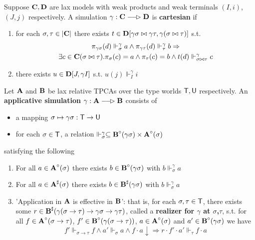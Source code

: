 \documentclass[11pt]{article}
\begin{document}
\begin{definition}[]
Suppose \(\operatorname{\textbf{C}},\operatorname{\textbf{D}}\) are lax models with weak products and weak terminals \((I,i)\), \((J,j)\)
respectively. A simulation \(\gamma:\bC\lrarhd\bD\) is \textbf{cartesian} if
\begin{enumerate}
\item for each \(\sigma,\tau\in\abs{\bC}\) there exists \(t\in\operatorname{\textbf{D}}[\gamma\sigma\bowtie\gamma\tau,\gamma(\sigma\bowtie\tau)]\) s.t.
\begin{gather*}
\pi_{\gamma\sigma}(d)\Vdash_\sigma^\gamma a\wedge\pi_{\gamma\tau}(d)\Vdash_\tau^\gamma b\Rightarrow\\
\exists c\in\operatorname{\textbf{C}}(\sigma\bowtie\tau).\pi_\sigma(c)=a\wedge\pi_\tau(c)=b\wedge t(d)\Vdash_{\sigma\bowtie\tau}^\gamma c
\end{gather*}
\item there exists \(u\in\operatorname{\textbf{D}}[J,\gamma I]\) s.t. \(u(j)\Vdash_I^\gamma i\)
\end{enumerate}
\end{definition}


\begin{definition}[]
Let \(\operatorname{\textbf{A}}\) and \(\operatorname{\textbf{B}}\) be lax relative TPCAs over the type worlds \(\textsf{T},\textsf{U}\) respectively. An
\textbf{applicative simulation} \(\gamma:\bA\lrarhd\bB\) consists of
\begin{itemize}
\item a mapping \(\sigma\mapsto\gamma\sigma:\textsf{T}\to\textsf{U}\)
\item for each \(\sigma\in\textsf{T}\), a relation \(\Vdash_\sigma^\gamma\subseteq\operatorname{\textbf{B}}^\circ(\gamma\sigma)\times\operatorname{\textbf{A}}^\circ(\sigma)\)
\end{itemize}
satisfying the following
\begin{enumerate}
\item For all \(a\in\operatorname{\textbf{A}}^\circ(\sigma)\) there exists \(b\in\operatorname{\textbf{B}}^\circ(\gamma\sigma)\) with \(b\Vdash_\sigma^\gamma a\)
\item For all \(a\in\operatorname{\textbf{A}}^\sharp(\sigma)\) there exists \(b\in\operatorname{\textbf{B}}^\sharp(\gamma\sigma)\) with \(b\Vdash_\sigma^\gamma a\)
\item 'Application in \(\operatorname{\textbf{A}}\) is effective in \(\operatorname{\textbf{B}}\)': that is, for each \(\sigma,\tau\in\textsf{T}\), there exists
some \(r\in\operatorname{\textbf{B}}^\sharp(\gamma(\sigma\to\tau)\to\gamma\sigma\to\gamma\tau)\), called a \textbf{realizer for \(\gamma\) at \(\sigma\),\(\tau\)}, s.t. for
all \(f\in\operatorname{\textbf{A}}^\circ(\sigma\to\tau)\), \(f'\in\operatorname{\textbf{B}}^\circ(\gamma(\sigma\to\tau))\), \(a\in\operatorname{\textbf{A}}^\circ(\sigma)\) and \(a'\in\operatorname{\textbf{B}}^\circ(\gamma\sigma)\) we have
\begin{equation*}
f'\Vdash_{\sigma\to\tau}f\wedge a'\Vdash_\sigma a\wedge f\cdot a\downarrow\Rightarrow r\cdot f'\cdot a'\Vdash_\tau f\cdot a
\end{equation*}
\end{enumerate}
\end{definition}
\end{document}

